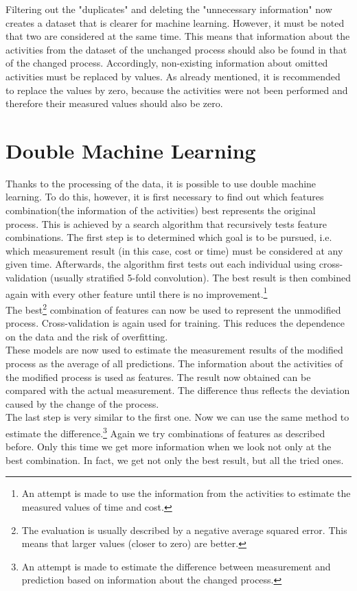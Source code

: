     Filtering out the "duplicates" and deleting the "unnecessary information" now creates a dataset that is clearer for machine learning. However, it must be noted that two are considered at the same time. This means that information about the activities from the dataset of the unchanged process should also be found in that of the changed process. Accordingly, non-existing information about omitted activities must be replaced by values. As already mentioned, it is recommended to replace the values by zero, because the activities were not been performed and therefore their measured values should also be zero.

    \section{Double Machine Learning}
    Thanks to the processing of the data, it is possible to use double machine learning. To do this, however, it is first necessary to find out which features combination(the information of the activities) best represents the original process. This is achieved by a search algorithm that recursively tests feature combinations. The first step is to determined which goal is to be pursued, i.e. which measurement result (in this case, cost or time) must be considered at any given time. Afterwards, the algorithm first tests out each individual using cross-validation (usually stratified 5-fold convolution). The best result is then combined again with every other feature until there is no improvement.\footnote{An attempt is made to use the information from the activities to estimate the measured values of time and cost.}\\
    The best\footnote{The evaluation is usually described by a negative average squared error. This means that larger values (closer to zero) are better.} combination of features can now be used to represent the unmodified process. Cross-validation is again used for training. This reduces the dependence on the data and the risk of overfitting.\\
    These models are now used to estimate the measurement results of the modified process as the average of all predictions. The information about the activities of the modified process is used as features. The result now obtained can be compared with the actual measurement. The difference thus reflects the deviation caused by the change of the process.\\
    The last step is very similar to the first one. Now we can use the same method to estimate the difference.\footnote{An attempt is made to estimate the difference between measurement and prediction based on information about the changed process.} Again we try combinations of features as described before. Only this time we get more information when we look not only at the best combination. In fact, we get not only the best result, but all the tried ones.\\
